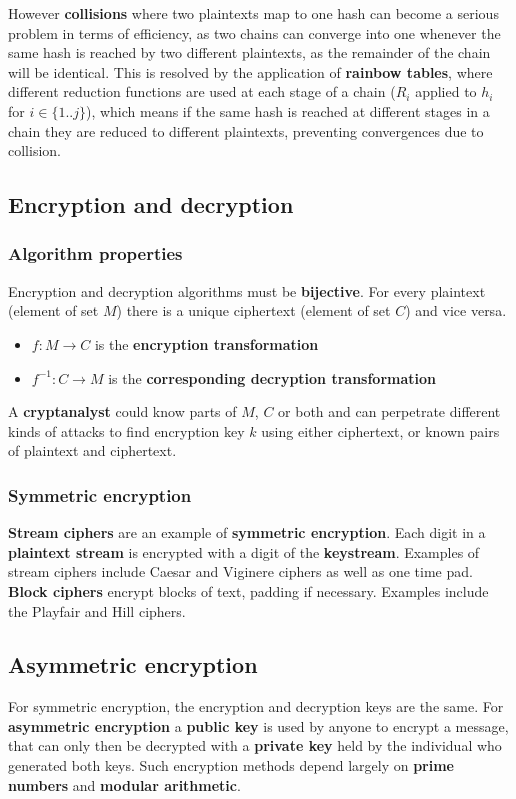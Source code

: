 \documentclass{article}
\newcommand{\np}{\vspace{8pt} \\}
\begin{document}
However \textbf{collisions} where two plaintexts map to one hash can become a serious problem in terms of efficiency, as two chains can converge into one whenever the same hash is reached by two different plaintexts, as the remainder of the chain will be identical. This is resolved by the application of \textbf{rainbow tables}, where different reduction functions are used at each stage of a chain ($ R_{i} $ applied to $ h_{i} $ for $ i \in \{1..j\} $), which means if the same hash is reached at different stages in a chain they are reduced to different plaintexts, preventing convergences due to collision.

\subsection{Encryption and decryption}

\subsubsection{Algorithm properties}
Encryption and decryption algorithms must be \textbf{bijective}. For every plaintext (element of set $ M $) there is a unique ciphertext (element of set $ C $) and vice versa.
\begin{itemize}
	\item $ f : M \rightarrow C $ is the \textbf{encryption transformation}
	\item $ f^{-1} : C \rightarrow M $ is the \textbf{corresponding decryption transformation}
\end{itemize}
A \textbf{cryptanalyst} could know parts of $ M $, $ C $ or both and can perpetrate different kinds of attacks to find encryption key $ k $ using either ciphertext, or known pairs of plaintext and ciphertext.

\subsubsection{Symmetric encryption}
\textbf{Stream ciphers} are an example of \textbf{symmetric encryption}. Each digit in a \textbf{plaintext stream} is encrypted with a digit of the \textbf{keystream}. Examples of stream ciphers include Caesar and Viginere ciphers as well as one time pad. \np
\textbf{Block ciphers} encrypt blocks of text, padding if necessary. Examples include the Playfair and Hill ciphers.

\subsection{Asymmetric encryption}
For symmetric encryption, the encryption and decryption keys are the same. For \textbf{asymmetric encryption} a \textbf{public key} is used by anyone to encrypt a message, that can only then be decrypted with a \textbf{private key} held by the individual who generated both keys. Such encryption methods depend largely on \textbf{prime numbers} and \textbf{modular arithmetic}.
\end{document}

